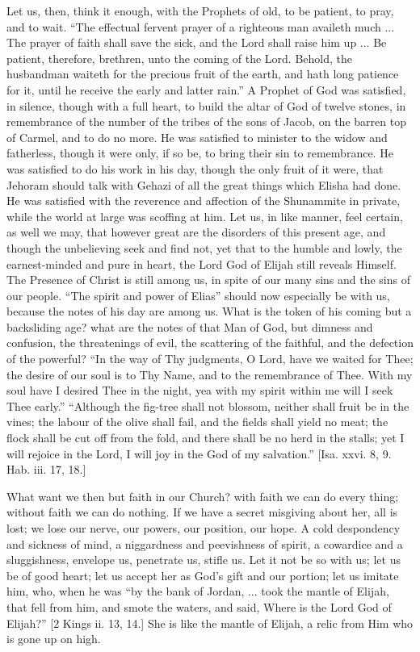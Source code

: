 Let us, then, think it enough, with the Prophets of old, to be
patient, to pray, and to wait. ``The effectual fervent prayer of a
righteous man availeth much ... The prayer of faith shall save the
sick, and the Lord shall raise him up ... Be patient, therefore,
brethren, unto the coming of the Lord. Behold, the husbandman waiteth
for the precious fruit of the earth, and hath long patience for it,
until he receive the early and latter rain.'' A Prophet of God was
satisfied, in silence, though with a full heart, to build the altar of
God of twelve stones, in remembrance of the number of the tribes of
the sons of Jacob, on the barren top of Carmel, and to do no more. He
was satisfied to minister to the widow and fatherless, though it were
only, if so be, to bring their sin to remembrance. He was satisfied to
do his work in his day, though the only fruit of it were, that Jehoram
should talk with Gehazi of all the great things which Elisha had done.
He was satisfied with the reverence and affection of the Shunammite in
private, while the world at large was scoffing at him. Let us, in like
manner, feel certain, as well we may, that however great are the
disorders of this present age, and though the unbelieving seek and
find not, yet that to the humble and lowly, the earnest-minded and
pure in heart, the Lord God of Elijah still reveals Himself. The
Presence of Christ is still among us, in spite of our many sins and
the sins of our people. ``The spirit and power of Elias''
should now especially be with us, because the notes of his day are
among us. What is the token of his coming but a backsliding age? what
are the notes of that Man of God, but dimness and confusion, the
threatenings of evil, the scattering of the faithful, and the
defection of the powerful? ``In the way of Thy judgments, O Lord,
have we waited for Thee; the desire of our soul is to Thy Name, and to
the remembrance of Thee. With my soul have I desired Thee in the
night, yea with my spirit within me will I seek Thee early.''
``Although the fig-tree shall not blossom, neither shall fruit be
in the vines; the labour of the olive shall fail, and the fields shall
yield no meat; the flock shall be cut off from the fold, and there
shall be no herd in the stalls; yet I will rejoice in the Lord, I will
joy in the God of my salvation.'' [Isa. xxvi. 8, 9. Hab. iii. 17,
18.]

What want we then but faith in our Church? with faith we can do
every thing; without faith we can do nothing. If we have a secret
misgiving about her, all is lost; we lose our nerve, our powers, our
position, our hope. A cold despondency and sickness of mind, a
niggardness and peevishness of spirit, a cowardice and a sluggishness,
envelope us, penetrate us, stifle us. Let it not be so with us; let us
be of good heart; let us accept her as God's gift and our portion; let
us imitate him, who, when he was ``by the bank of Jordan, ... took
the mantle of Elijah, that fell from him, and smote the waters, and
said, Where is the Lord God of Elijah?'' [2 Kings ii. 13, 14.] She
is like the mantle of Elijah, a relic from Him who is gone up on high.

